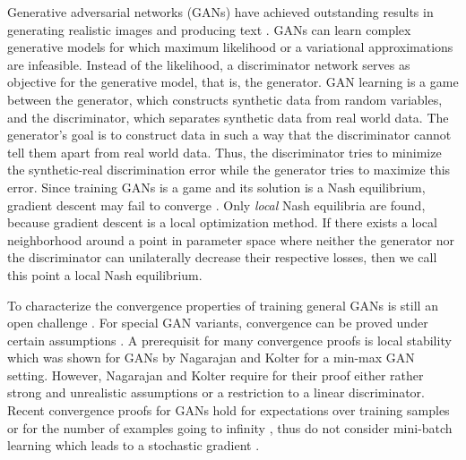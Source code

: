\documentclass{article}
\begin{document}
Generative adversarial networks (GANs) \cite{Goodfellow:14nips} have achieved
outstanding results in generating realistic images
\cite{Radford:15,Ledig:16,Isola:17,Arjovsky:17,Berthelot:17}
and  producing text \cite{Gulrajani:17}. GANs can learn complex generative models
for which maximum likelihood or a variational approximations are infeasible.
Instead of the likelihood, a discriminator network serves as objective for the
generative model, that is, the generator.
GAN learning is a game between the generator, which constructs synthetic data
from random variables, and the discriminator, which separates synthetic data
from real world data. The generator's goal is to construct data in such a way
that the discriminator cannot tell them apart from real world data.
Thus, the discriminator tries to minimize the synthetic-real discrimination
error while the generator tries to maximize this error.
Since training GANs is a game and its solution is a Nash equilibrium, gradient
descent may fail to converge
\cite{Salimans:16,Goodfellow:14nips,Goodfellow:17tutorial}.
Only \textit{local} Nash equilibria
are found, because gradient descent is a local optimization method.
If there exists a local neighborhood around a point in parameter space
where neither the generator nor the discriminator can unilaterally decrease
their respective losses, then we call this point a local Nash equilibrium.

To characterize the convergence properties of training general GANs is still an
open challenge \cite{Goodfellow:14criteria,Goodfellow:17tutorial}.
For special GAN variants, convergence can be proved under certain assumptions
\cite{Lim:17,Grnarova:17,Tolstikhin:17}. A prerequisit for many convergence
proofs is local stability \cite{Kushner:03} which was shown for GANs by
Nagarajan and Kolter \cite{Nagarajan:17} for a min-max GAN setting. However,
Nagarajan and Kolter require for their proof either 
rather strong and unrealistic assumptions or a restriction to a linear discriminator.
Recent convergence proofs for GANs hold for expectations over training samples
or for the number of examples going to infinity \cite{Li:17mmd,Mroueh:17fisher,Liu:17,Arora:17},
thus do not consider mini-batch learning which leads to a stochastic gradient
\cite{Wang:17,Hjelm:17,Mescheder:17,Li:17}.
\end{document}
